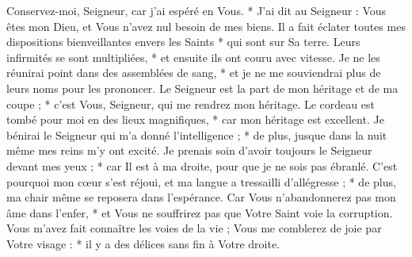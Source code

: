 Conservez-moi, Seigneur, car j'ai espéré en Vous. * J'ai dit au Seigneur : Vous êtes mon Dieu, et Vous n'avez nul besoin de mes biens.
\versseparator
 Il a fait éclater toutes mes dispositions bienveillantes envers les Saints * qui sont sur Sa terre.
\versseparator
 Leurs infirmités se sont multipliées, * et ensuite ils ont couru avec vitesse.
\versseparator
 Je ne les réunirai point dans des assemblées de sang, * et je ne me souviendrai plus de leurs noms pour les prononcer.
\versseparator
 Le Seigneur est la part de mon héritage et de ma coupe ; * c'est Vous, Seigneur, qui me rendrez mon héritage.
\versseparator
 Le cordeau est tombé pour moi en des lieux magnifiques, * car mon héritage est excellent.
\versseparator
 Je bénirai le Seigneur qui m'a donné l'intelligence ; * de plus, jusque dans la nuit même mes reins m'y ont excité.
\versseparator
 Je prenais soin d'avoir toujours le Seigneur devant mes yeux ; * car Il est à ma droite, pour que je ne sois pas ébranlé.
\versseparator
 C'est pourquoi mon cœur s'est réjoui, et ma langue a tressailli d'allégresse ; * de plus, ma chair même se reposera dans l'espérance.
\versseparator
 Car Vous n'abandonnerez pas mon âme dans l'enfer, * et Vous ne souffrirez pas que Votre Saint voie la corruption.
\versseparator
 Vous m'avez fait connaître les voies de la vie ; Vous me comblerez de joie par Votre visage : * il y a des délices sans fin à Votre droite.
